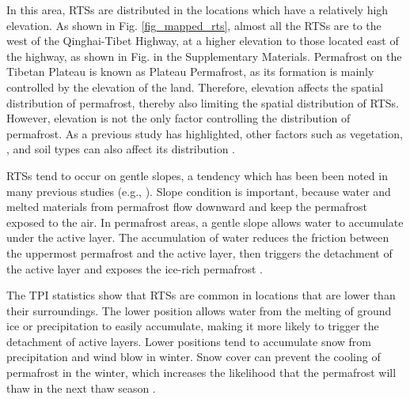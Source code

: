 \documentclass[authoryear,preprint,review,12pt]{elsarticle}
\begin{document}




In this area, RTSs are distributed in the locations which have a relatively high elevation.
As shown in Fig. \ref{fig_mapped_rts}, almost all the RTSs are to the west of the Qinghai-Tibet Highway, at a higher elevation to those located east of the highway, as shown in Fig.  in the Supplementary Materials. Permafrost on the Tibetan Plateau is known as Plateau Permafrost, as its formation is mainly controlled by the elevation of the land. Therefore, elevation affects the spatial distribution of permafrost, thereby also limiting the spatial distribution of RTSs. However, elevation is not the only factor controlling the distribution of permafrost. As a previous study has highlighted, other factors such as vegetation, , and soil types can also affect its distribution \citep{yin2017effects}.

RTSs tend to occur on gentle slopes, a tendency which has been been noted in many previous studies (e.g., \citealp{leibman1995cryogenic, niu2014thaw, lacelle_distribution_2015}). Slope condition is important, because water and melted materials from permafrost flow downward and keep the permafrost exposed to the air. In permafrost areas, a gentle slope allows water to accumulate under the active layer. The accumulation of water reduces the friction between the uppermost permafrost and the active layer,  then triggers the detachment of the active layer and exposes the ice-rich permafrost \citep{mcroberts1974stability, mcroberts1974the}. 

The TPI statistics show that RTSs are common in locations that are lower than their surroundings. The lower position allows water from the melting of ground ice or precipitation to easily accumulate, making it more likely to trigger the detachment of active layers. Lower positions tend to accumulate snow from precipitation and wind blow in winter. Snow cover can prevent the cooling of permafrost in the winter, which increases the likelihood that the permafrost will thaw in the next thaw season . 
\end{document}
